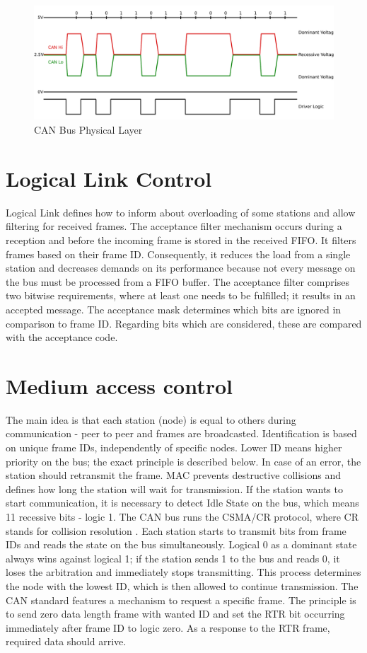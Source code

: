 \documentclass{ctuthesis}
\begin{document}
\begin{figure}[htb]
 \includegraphics[width=1\textwidth]{images/ISO11898-2.pdf}
 \caption{CAN Bus Physical Layer \cite{can_physical}}
\end{figure}
 
 \section{Logical Link Control}
 Logical Link defines how to inform about overloading of some stations and allow filtering for received frames. The acceptance filter mechanism occurs during a reception and before the incoming frame is stored in the received FIFO. It filters frames based on their frame ID. Consequently, it reduces the load from a single station and decreases demands on its performance because not every message on the bus must be processed from a FIFO buffer. The acceptance filter comprises two bitwise requirements, where at least one needs to be fulfilled; it results in an accepted message. The acceptance mask determines which bits are ignored in comparison to frame ID. Regarding bits which are considered, these are compared with the acceptance code\cite{can_filter}.
 
 \section{Medium access control}
 The main idea is that each station (node) is equal to others during communication - peer to peer and frames are broadcasted. Identification is based on unique frame IDs, independently of specific nodes. Lower ID means higher priority on the bus; the exact principle is described below. In case of an error, the station should retransmit the frame. MAC prevents destructive collisions and defines how long the station will wait for transmission. If the station wants to start communication, it is necessary to detect Idle State on the bus, which means 11 recessive bits - logic 1. The CAN bus runs the CSMA/CR protocol, where CR stands for collision resolution \cite{can-course}. Each station starts to transmit bits from frame IDs and reads the state on the bus simultaneously. Logical 0 as a dominant state always wins against logical 1; if the station sends 1 to the bus and reads 0, it loses the arbitration and immediately stops transmitting. This process determines the node with the lowest ID, which is then allowed to continue transmission. The CAN standard features a mechanism to request a specific frame. The principle is to send zero data length frame with wanted ID and set the RTR bit occurring immediately after frame ID to logic zero. As a response to the RTR frame, required data should arrive.
 
\end{document}
